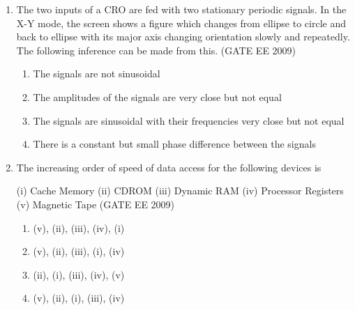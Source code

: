 \documentclass[journal,12pt,onecolumn]{IEEEtran}
\theoremstyle{remark}
\begin{document}
\begin{flushleft}
\begin{enumerate}
\begin{enumerate}
\item  {}


\item  {}


\item {}
 \end{enumerate}


\item The two inputs of a CRO are fed with two stationary periodic signals. In the X-Y mode, the screen shows a figure which changes from ellipse to circle and back to ellipse with its major axis changing orientation slowly and repeatedly. The following inference can be made from this. 
\hfill(GATE EE 2009)
\begin{enumerate}
    \item  The signals are not sinusoidal 
\item  The amplitudes of the signals are very close but not equal 
\item  The signals are sinusoidal with their frequencies very close but not equal 
\item There is a constant but small phase difference between the signals
\end{enumerate}


\item The increasing order of speed of data access for the following devices is

(i) Cache Memory \quad (ii) CDROM \quad (iii) Dynamic RAM \quad (iv) Processor Registers \quad (v) Magnetic Tape 
\hfill(GATE EE 2009)
\begin{enumerate}
    \item  (v), (ii), (iii), (iv), (i) 
\item  (v), (ii), (iii), (i), (iv) 
\item  (ii), (i), (iii), (iv), (v) 
\item  (v), (ii), (i), (iii), (iv)
\end{enumerate}



\end{enumerate}
\end{flushleft}
\end{document}
